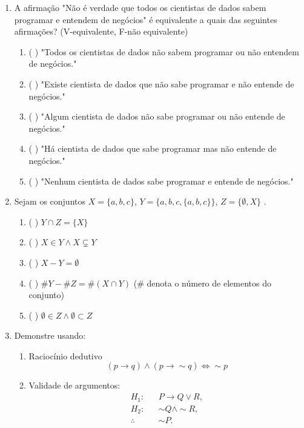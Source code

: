 \documentclass[a4paper,12pt]{letter}  %
\begin{document}
\begin{enumerate}
    \item A afirmação "Não é verdade que todos os cientistas de dados sabem programar e entendem de negócios" é equivalente a quais das seguintes afirmações? (V-equivalente, F-não equivalente)
    \begin{enumerate}
        \item ( ) "Todos os cientistas de dados não sabem programar ou não entendem de negócios."
        \item ( ) "Existe cientista de dados que não sabe programar e não entende de negócios."
        \item ( ) "Algum cientista de dados não sabe programar ou não entende de negócios."
        \item ( ) "Há cientista de dados que sabe programar mas não entende de negócios."
        \item ( ) "Nenhum cientista de dados sabe programar e entende de negócios."
    \end{enumerate}

    \item Sejam os conjuntos $X=\{a,b,c\}$, $Y = \{a,b,c,\{a,b,c\}\}$, $Z=\{\emptyset, X\}$ .
    \begin{enumerate}
        \item ( ) $Y \cap Z = \{X\}$
        \item ( ) $X \in Y \wedge X \subsetneq Y$
        \item ( ) $X - Y = \emptyset$
        \item ( ) $\#Y - \#Z = \#(X \cap Y)$  \hspace{1cm}  ($\#$ denota o número de elementos do conjunto)
        \item ( ) $ \emptyset \in Z \wedge \emptyset \subset Z$
    \end{enumerate}

    \item Demonstre usando:
    \begin{enumerate}
        \item Raciocínio dedutivo 
         $$  (p \rightarrow q) \land (p \rightarrow \sim q) \Leftrightarrow \sim p $$
        \item Validade de argumentos: 
            \begin{align*}
	            H_1:& & P \rightarrow Q \lor R,\\
	            H_2:& & \sim Q \land \sim R,\\
	            \therefore & & \sim P.
	        \end{align*}
    \end{enumerate}
           
\end{enumerate}
\end{document}
